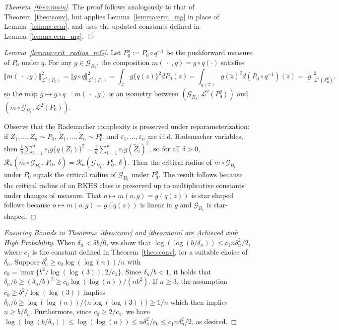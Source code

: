 \documentclass[twoside,11pt]{article}
\newcommand{\mc}{\mathcal}
\begin{document}
\begin{proof}[Theorem~\ref{theo:main}]
    The proof follows analogously to that of Theorem~\ref{theo:conv}, but applies Lemma~\ref{lemma:erm_mg} in place of Lemma~\ref{lemma:erm}, and uses the updated constants defined in Lemma~\ref{lemma:erm_mg}.
\end{proof}


\begin{proof}[Lemma~\ref{lemma:crit_radius_mG}] Let $P_0^q:=P_0\circ q^{-1}$ be the pushforward measure of $P_0$ under $q$. For any $g\in\mc{G}_{B_1}$, the composition $m(\:\cdot\:,g)=g\circ q(\cdot)$ satisfies
\[
\Vert m(\:\cdot\:,g)\Vert_{\mc{L}^2(P_0)}^2=\Vert g\circ q \Vert_{\mc{L}^2(P_0)}^2=\int_\mc{Z}g\{q(z)\}^2dP_0(z)=\int_{q(\mc{Z})}g(\tilde z)^2d(P_0\circ q^{-1})(\tilde z)=\Vert g\Vert_{\mc{L}^2(P_0^q)}^2,
\]
so the map $g\mapsto g\circ q=m(\:\cdot\:,g)$ is an isometry between $(\mc{G}_{B_1},\mc{L}^2(P_0^q))$ and $(m\circ\mc{G}_{B_1},\mc{L}^2(P_0))$.

Observe that the Rademacher complexity is preserved under reparameterization: if  $Z_1,\dots,Z_n\sim P_{0}$, $\tilde Z_1,\dots,\tilde Z_n\sim P_0^q$, and $\varepsilon_1,\dots,\varepsilon_n$ are i.i.d. Rademacher variables, then $\frac{1}{n}\sum_{i=1}^n\varepsilon_ig\{q(Z_i)\}^2=\frac{1}{n}\sum_{i=1}^n\varepsilon_ig(\tilde Z_i)^2$,
so for all $\delta>0$, $\mathcal{R}_n(m\circ \mathcal{G}_{B_1},\:P_0,\:\delta) = \mathcal{R}_n(\mathcal{G}_{B_1},\:P_0^q,\:\delta)$. Then the critical radius of $m\circ\mc{G}_{B_1}$ under $P_0$ equals the critical radius of $\mc{G}_{B_1}$ under $P_0^q$. The result follows because the critical radius of an RKHS class is preserved up to multiplicative constants under changes of measure. That $o \mapsto m(o, g) = g(q(z))$ is star shaped follows because $o \mapsto m(o, g) = g(q(z))$ is linear in $g$ and $\mc{G}_{B_1}$ is star-shaped.
\end{proof}

\begin{proof}[Ensuring Bounds in Theorems~\ref{theo:conv} and \ref{theo:main} are Achieved with High Probability]
    When $\delta_n<5b/6$, we show that $\log(\log(b/\delta_n))\le c_1n\delta_n^2/2$, where $c_1$ is the constant defined in Theorem~\ref{theo:conv}, for a suitable choice of $\delta_n$. Suppose $\delta_n^2\ge c_0\log(\log(n))/n$ with $c_0=\max\{b^2/\log(\log(3)),2/c_1\}$. Since $\delta_n/b<1$, it holds that $\delta_n/b\ge(\delta_n/b)^2\ge c_0\log(\log(n))/(nb^2)$. If $n\ge 3$, the assumption $c_0\ge b^2/\log(\log(3))$ implies $\delta_n/b\ge \log(\log(n))/\{n\log(\log(3))\}\ge1/n$ which then implies $ n\ge b/\delta_n$. Furthermore, since $c_0\ge 2/c_1$, we have $\log(\log(b/\delta_n))\le \log(\log(n))\le n\delta_n^2/c_0\le c_1n\delta_n^2/2$,
as desired.
\end{proof}
\end{document}
